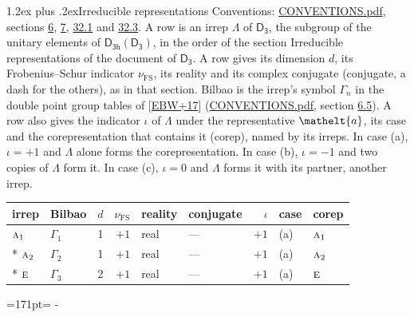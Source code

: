 \documentclass[10pt,a4paper]{article}
\makeatletter
\renewcommand\section{\@startsection{section}{1}{\z@}{-3ex plus -1ex minus -.2ex}%
  {1.2ex plus .2ex}{\normalfont\large\sffamily\bfseries\color{parttitle}}}
\newcommand{\needspace}[1]{\par\penalty-100\begingroup\dimen0=#1\relax\dimen2=\pagegoal
  \advance\dimen2-\pagetotal\ifdim\dimen0>\dimen2\relax\ifdim\dimen2>0pt\vfil\break\fi\fi
  \endgroup}
\numberwithin{equation}{section}
\newcommand{\eltfont}[1]{{\let\sigma\eltsigma\mathelt{#1}}}
\newcommand{\grp}[1]{\mathsf{#1}}
\newcommand{\irr}[1]{\text{\normalfont\scshape #1}}
\newcommand{\elt}[1]{\eltfont{#1}}
\newcommand{\fsind}{\nu_{\mathrm{FS}}}
\makeatother
\begin{document}
\section{Irreducible representations}\label{s:irreps}
Conventions: \href{../../CONVENTIONS.pdf}{CONVENTIONS.pdf}, sections \href{../../../rotation/CONVENTIONS.pdf\#conv.6}{6}, \href{../../../rotation/CONVENTIONS.pdf\#conv.7}{7}, \href{../../CONVENTIONS.pdf\#conv.32.1}{32.1} and \href{../../CONVENTIONS.pdf\#conv.32.3}{32.3}.
\leavevmode\label{n:irrep.Delta}A row is an irrep $\Lambda$ of $\grp{D_{3}}$, the subgroup of the unitary elements of $\grp{D_{3h}}(\grp{D_{3}})$, in the order of the section Irreducible representations of the document of \href{../../../rotation/data/pdf/D3.pdf}{$\grp{D_{3}}$}. \label{n:index.dimension}\label{n:index.frobenius}\label{n:head.irrep}\label{n:head.reality}\label{n:head.conjugate}A row gives its dimension $d$, its Frobenius--Schur indicator $\fsind$, its reality and its complex conjugate (conjugate, a dash for the others), as in that section. \label{n:head.bilbao}\label{n:irrep.alias.gamma}Bilbao is the irrep's symbol $\Gamma_n$ in the double point group tables of [\href{../../../REFERENCES.pdf\#ref.EBW+17}{EBW+17}] (\href{../../CONVENTIONS.pdf}{CONVENTIONS.pdf}, section \href{../../../rotation/CONVENTIONS.pdf\#conv.6.5}{6.5}). \label{n:head.case.corep}\label{n:head.corep}A row also gives the indicator $\iota$ of $\Lambda$ under the representative $\elt{a}$, its case and the corepresentation that contains it (corep), named by its irreps. In case (a), $\iota = +1$ and $\Lambda$ alone forms the corepresentation. In case (b), $\iota = -1$ and two copies of $\Lambda$ form it. In case (c), $\iota = 0$ and $\Lambda$ forms it with its partner, another irrep.
\setlength{\emergencystretch}{2em}\par\setlength{\emergencystretch}{0pt}
{\small\renewcommand{\arraystretch}{1.25}\setlength{\tabcolsep}{4pt}\begin{longtable}{@{}llrrllrll@{}}\toprule
irrep & Bilbao & $d$ & $\fsind$ & reality & conjugate & $\iota$ & case & corep\\\midrule\endhead
\bottomrule\endfoot\endlastfoot
$\irr{a}_{1}$ & $\Gamma_{1}$ & 1 & $+1$ & real & --- & $+1$ & (a) & $\irr{a}_{1}$\\*
$\irr{a}_{2}$ & $\Gamma_{2}$ & 1 & $+1$ & real & --- & $+1$ & (a) & $\irr{a}_{2}$\\*
$\irr{e}$ & $\Gamma_{3}$ & 2 & $+1$ & real & --- & $+1$ & (a) & $\irr{e}$\\
\bottomrule\end{longtable}}
\needspace{171pt}
\end{document}
